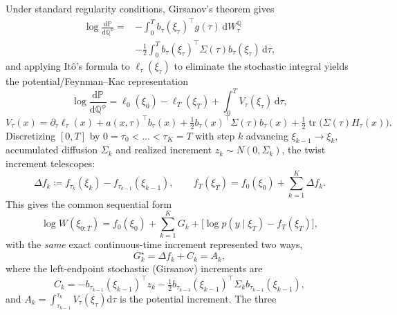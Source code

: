 \documentclass[11pt]{article}
\newcommand{\bbP}{\mathbb{P}}
\newcommand{\bbQ}{\mathbb{Q}}
\newcommand{\dd}{\mathrm{d}}
\newcommand{\tr}{\operatorname{tr}}
\begin{document}
Under standard regularity conditions, Girsanov's theorem gives
\begin{equation}\label{eq:girsanov}
\begin{aligned}
  \log\frac{\dd\bbP}{\dd\bbQ^\phi}
  ={} &-\int_0^T b_\tau(\xi_\tau)^\top g(\tau)\,\dd W^{\bbQ}_\tau \\
  &-\frac12\int_0^T b_\tau(\xi_\tau)^\top \Sigma(\tau) b_\tau(\xi_\tau)\,\dd\tau,
\end{aligned}
\end{equation}
and applying It\^o's formula to $\ell_\tau(\xi_\tau)$ to eliminate the stochastic integral yields the
potential/\allowbreak Feynman--Kac representation
\begin{equation}\label{eq:potential}
  \log\frac{\dd\bbP}{\dd\bbQ^\phi}
  = \ell_0(\xi_0)-\ell_T(\xi_T)+\int_0^T V_\tau(\xi_\tau)\,\dd\tau,
\end{equation}
\begin{equation}\label{eq:Vtau}
  V_\tau(x) = \partial_\tau\ell_\tau(x)
  + a(x,\tau)^\top b_\tau(x)
  + \tfrac12 b_\tau(x)^\top\Sigma(\tau)b_\tau(x)
  + \tfrac12\tr\!\bigl(\Sigma(\tau)H_\tau(x)\bigr).
\end{equation}
Discretizing $[0,T]$ by $0=\tau_0<\dots<\tau_K=T$ with step $k$ advancing $\xi_{k-1}\to\xi_k$,
accumulated diffusion $\Sigma_k$ and realized increment $z_k\sim N(0,\Sigma_k)$, the twist increment
telescopes:
\begin{equation}\label{eq:twist-increment}
  \Delta f_k \coloneqq f_{\tau_k}(\xi_k) - f_{\tau_{k-1}}(\xi_{k-1}),
  \qquad
  f_T(\xi_T) = f_0(\xi_0) + \sum_{k=1}^K \Delta f_k .
\end{equation}
This gives the common sequential form
\begin{equation}\label{eq:logW}
  \log W(\xi_{0:T})
  = f_0(\xi_0) + \sum_{k=1}^K G_k + \bigl[\log p(y\mid\xi_T)-f_T(\xi_T)\bigr],
\end{equation}
with the \emph{same} exact continuous-time increment represented two ways,
\begin{equation}\label{eq:Gstar}
  G_k^\star = \Delta f_k + C_k = A_k,
\end{equation}
where the left-endpoint stochastic (Girsanov) increments are
\begin{equation}\label{eq:Ck}
  C_k = -b_{\tau_{k-1}}(\xi_{k-1})^\top z_k
  - \tfrac12 b_{\tau_{k-1}}(\xi_{k-1})^\top\Sigma_k b_{\tau_{k-1}}(\xi_{k-1}),
\end{equation}
and $A_k=\int_{\tau_{k-1}}^{\tau_k} V_\tau(\xi_\tau)\dd\tau$ is the potential increment. The three
\end{document}
